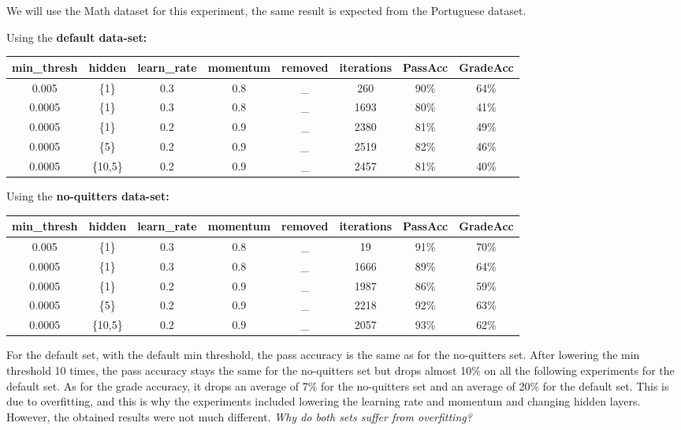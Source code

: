 \documentclass[11pt]{article}
\begin{document}
We will use the Math dataset for this experiment, the same result is expected from the Portuguese dataset.

Using the \textbf{default data-set:}

\begin{tabular}{| c | c | c | c | c | c | c | c |}
\hline \textbf{min\_thresh} & \textbf{hidden} & \textbf{learn\_rate} & \textbf{momentum} & \textbf{removed} & \textbf{iterations} & \textbf{PassAcc} & \textbf{GradeAcc}\\
\hline 0.005 & \{1\} & 0.3 & 0.8 & \_ & 260 & 90\% & 64\%\\
\hline 0.0005 & \{1\} & 0.3 & 0.8 & \_ & 1693 & 80\% & 41\%\\
\hline 0.0005 & \{1\} & 0.2 & 0.9 & \_ & 2380 & 81\% & 49\%\\
\hline 0.0005 & \{5\} & 0.2 & 0.9 & \_ & 2519 & 82\% & 46\%\\
\hline 0.0005 & \{10,5\} & 0.2 & 0.9 & \_ & 2457 & 81\% & 40\%\\
\hline
\end{tabular}

\hfill \break
\hfill \break
Using the \textbf{no-quitters data-set:}

\begin{tabular}{| c | c | c | c | c | c | c | c |}
\hline \textbf{min\_thresh} & \textbf{hidden} & \textbf{learn\_rate} & \textbf{momentum} & \textbf{removed} & \textbf{iterations} & \textbf{PassAcc} & \textbf{GradeAcc}\\
\hline 0.005 & \{1\} & 0.3 & 0.8 & \_ & 19 & 91\% & 70\%\\
\hline 0.0005 & \{1\} & 0.3 & 0.8 & \_ & 1666 & 89\% & 64\%\\
\hline 0.0005 & \{1\} & 0.2 & 0.9 & \_ & 1987 & 86\% & 59\%\\
\hline 0.0005 & \{5\} & 0.2 & 0.9 & \_ & 2218 & 92\% & 63\%\\
\hline 0.0005 & \{10,5\} & 0.2 & 0.9 & \_ & 2057 & 93\% & 62\%\\
\hline
\end{tabular}

\hfill \break
\hfill \break

For the default set, with the default min threshold, the pass accuracy is the same as for the no-quitters set. After lowering the min threshold 10 times, the pass accuracy stays the same for the no-quitters set but drops almost 10\% on all the following experiments for the default set. As for the grade accuracy, it drops an average of 7\% for the no-quitters set and an average of 20\% for the default set. This is due to overfitting, and this is why the experiments included lowering the learning rate and momentum and changing hidden layers. However, the obtained results were not much different.
\hfill \break
\hfill \break
\newpage
\textit{Why do both sets suffer from overfitting?}
\end{document}
